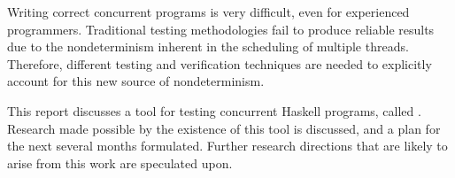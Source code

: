 Writing correct concurrent programs is very difficult, even for
experienced programmers. Traditional testing methodologies fail to
produce reliable results due to the nondeterminism inherent in the
scheduling of multiple threads. Therefore, different testing and
verification techniques are needed to explicitly account for this new
source of nondeterminism.

This report discusses a tool for testing concurrent Haskell programs,
called \dejafu{}. Research made possible by the existence of this tool
is discussed, and a plan for the next several months
formulated. Further research directions that are likely to arise from
this work are speculated upon.
